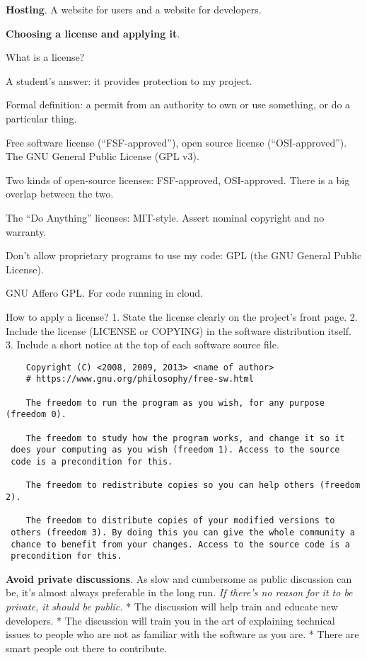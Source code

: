 \documentclass[landscape,30pt]{foils}
\begin{document}
{\bf Hosting}. A website for users and a website for developers.

{\bf Choosing a license and applying it}.

What is a license?

A student's answer: it provides protection to my project.

Formal definition:  a permit from an authority to own or use something, or do a particular thing.


Free software license (``FSF-approved''), open source license
(``OSI-approved'').  The GNU General Public License (GPL v3).

Two kinds of open-source licenses:  FSF-approved, OSI-approved.  There is a big overlap between the two.

The ``Do Anything'' licenses: MIT-style.  Assert nominal copyright and no warranty.

Don't allow proprietary programs to use my code: GPL (the GNU General Public License).

GNU Affero GPL.  For code running in cloud.


How to apply a license?  1. State the license clearly on the project's
front page.  2. Include the license (LICENSE or COPYING) in the
software distribution itself.  3.  Include a short notice at the top
of each software source file.


{\tiny
\begin{verbatim}
    Copyright (C) <2008, 2009, 2013> <name of author>
    # https://www.gnu.org/philosophy/free-sw.html

    The freedom to run the program as you wish, for any purpose (freedom 0).

    The freedom to study how the program works, and change it so it
 does your computing as you wish (freedom 1). Access to the source
 code is a precondition for this.

    The freedom to redistribute copies so you can help others (freedom 2).
    
    The freedom to distribute copies of your modified versions to
 others (freedom 3). By doing this you can give the whole community a
 chance to benefit from your changes. Access to the source code is a
 precondition for this.

\end{verbatim}
}

{\bf Avoid private discussions}. As slow and cumbersome as public discussion can be, it's almost always preferable in the long run. {\em If there's no reason for it to be private, it should be public.}  * The discussion will help train and educate new developers.   *  The discussion will train you in the art of explaining technical issues to people who are not as familiar with the software as you are.   * There are smart people out there to contribute.
\end{document}
